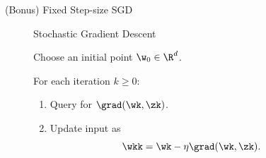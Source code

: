\documentclass[mathserif,notheorems, hyperref={colorlinks, citecolor=blue, urlcolor=blue, linkcolor=blue}]{beamer}
\begin{document}
    \begin{frame}{(Bonus) Fixed Step-size SGD}
       
        \begin{figure}[t]
        \begin{procedure}{Stochastic Gradient Descent}
        \item Choose an initial point \( \w_0 \in \R^d \).
            \vspace{2ex}
        \item For each iteration \( k \geq 0 \):
            \begin{enumerate}
                \item Query \oracle{} for \( \grad(\wk, \zk) \).
                    \vspace{1ex}
                \item Update input as\vspace{-1ex}%
                    \[ \wkk = \wk - \eta \grad(\wk, \zk). \]
            \end{enumerate}
        \end{procedure}
        \end{figure}

    \end{frame}
\end{document}
